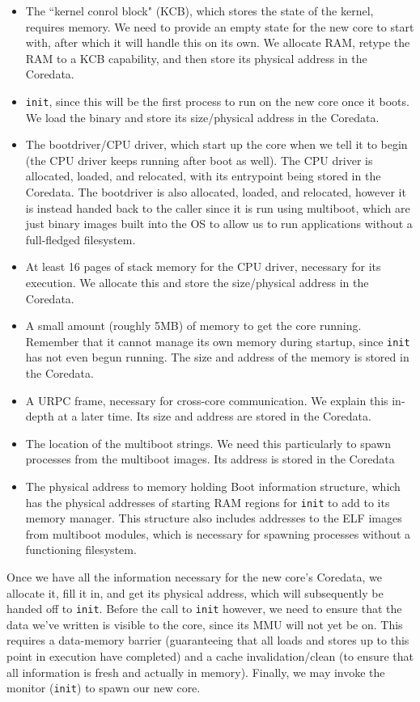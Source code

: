 \begin{itemize}[itemsep=0pt]
    \item The ``kernel conrol block" (KCB), which stores the state of the kernel, requires memory. We need to provide an empty state for the new core to start with, after which it will handle this on its own. We allocate RAM, retype the RAM to a KCB capability, and then store its physical address in the Coredata.
    \item \texttt{init}, since this will be the first process to run on the new core once it boots. We load the binary and store its size/physical address in the Coredata.
    \item The bootdriver/CPU driver, which start up the core when we tell it to begin (the CPU driver keeps running after boot as well). The CPU driver is allocated, loaded, and relocated, with its entrypoint being stored in the Coredata. The bootdriver is also allocated, loaded, and relocated, however it is instead handed back to the caller since it is run using multiboot, which are just binary images built into the OS to allow us to run applications without a full-fledged filesystem.
    \item At least 16 pages of stack memory for the CPU driver, necessary for its execution. We allocate this and store the size/physical address in the Coredata.
    \item A small amount (roughly 5MB) of memory to get the core running. Remember that it cannot manage its own memory during startup, since \texttt{init} has not even begun running. The size and address of the memory is stored in the Coredata.
    \item A URPC frame, necessary for cross-core communication. We explain this in-depth at a later time. Its size and address are stored in the Coredata.
    \item The location of the multiboot strings. We need this particularly to spawn processes from the multiboot images. Its address is stored in the Coredata
    \item The physical address to memory holding Boot information structure, which has the physical addresses of starting RAM regions for \texttt{init} to add to its memory manager. This structure also includes addresses to the ELF images from multiboot modules, which is necessary for spawning processes without a functioning filesystem.
\end{itemize}
Once we have all the information necessary for the new core's Coredata, we allocate it, fill it in, and get its physical address, which will subsequently be handed off to \texttt{init}. Before the call to \texttt{init} however, we need to ensure that the data we've written is visible to the core, since its MMU will not yet be on. This requires a data-memory barrier (guaranteeing that all loads and stores up to this point in execution have completed) and a cache invalidation/clean (to ensure that all information is fresh and actually in memory). Finally, we may invoke the monitor (\texttt{init}) to spawn our new core.

